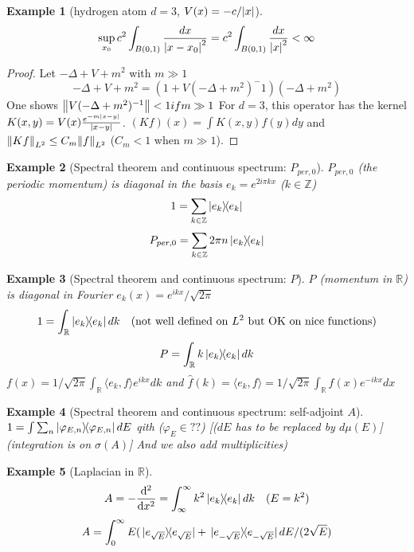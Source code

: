 \documentclass{article}
\newtheorem*{example}{Example}
\newcommand{\ZZ}{\mathbb{Z}}
\newcommand{\RR}{\mathbb{R}}
\newcommand{\sig}{\sigma}
\renewcommand{\sp}[2]{\langle #1,#2 \rangle}
\begin{document}
\begin{example}[hydrogen atom $d = 3$, $V(x) = -c/\abs{x}$]
  $$ \sup_{x_0} c^2 \int_{B(0,1)} \frac{dx}{\abs{x-x_0}^2} = c^2 \int_{B(0,1)} \frac{dx}{\abs{x}^2} < \infty $$
\end{example}

\begin{proof}
  Let $-\Delta + V +m^2$ with $m \gg 1$
  $$ -\Delta + V +m^2 = (1 + V(-\Delta+m^2)^-1 ) (-\Delta + m^2) $$
  One shows $\norm{V(-\Delta + m^2)^{-1}} < 1 if m \gg 1$
  For $d = 3$, this operator has the kernel $K(x,y) = V(x) \frac{e^{-m\abs{x-y}}}{\abs{x-y}}$.
  $(Kf)(x) = \int K(x,y) f(y) dy$ and 
  $\norm{Kf}_{L^2} \le C_m \norm{f}_{L^2}$  ($C_m < 1$ when $m \gg 1$).
\end{proof}
  
\begin{example}[Spectral theorem and continuous spectrum: $P_{per,0}$]
    $P_{per,0}$ (the periodic momentum) is diagonal in the basis $e_k = e^{2i\pi kx}$ ($k \in \ZZ$)
    $$ 1 = \sum_{k \in \ZZ} \dyad{e_k} $$
    $$ P_{per,0} = \sum_{k \in \ZZ} 2\pi n \dyad{e_k} $$
\end{example}

\begin{example}[Spectral theorem and continuous spectrum: $P$]
    $P$ (momentum in $\RR$) is diagonal in Fourier $e_k(x) = e^{ikx}/\sqrt{2\pi}$
    $$ 1 = \int_\RR   \dyad{e_k} dk  \quad \text{(not well defined on $L^2$ but OK on nice functions)} $$
    $$ P  = \int_\RR k \dyad{e_k} dk $$  
    $f(x) = 1/\sqrt{2\pi} \int_\RR \sp{e_k}{f} e^{ikx} dk$ and
    $\hat{f}(k) = \sp{e_k}{f} =  1/\sqrt{2\pi} \int_{\RR} f(x) e^{-ikx} dx$
\end{example}

\begin{example}[Spectral theorem and continuous spectrum: self-adjoint $A$]
    $1 = \int \sum_n \dyad{\varphi_{E,n}} dE$ qith ($\varphi_E \in ??$) [($dE$ has to be replaced by $d\mu(E)$] (integration is on $\sig(A)$] 
    And we also add multiplicities)
 \end{example}

\begin{example}[Laplacian in $\RR$]
  $$ A = - \dv[2]{}{x} = \int_\infty^\infty k^2 \dyad{e_k} dk \quad (E = k^2) $$
  $$ A = \int_0^\infty E (\dyad*{e_{\sqrt{E}}} + \dyad*{e_{-\sqrt{E}}} dE/(2\sqrt{E}) $$
\end{example}
\end{document}

